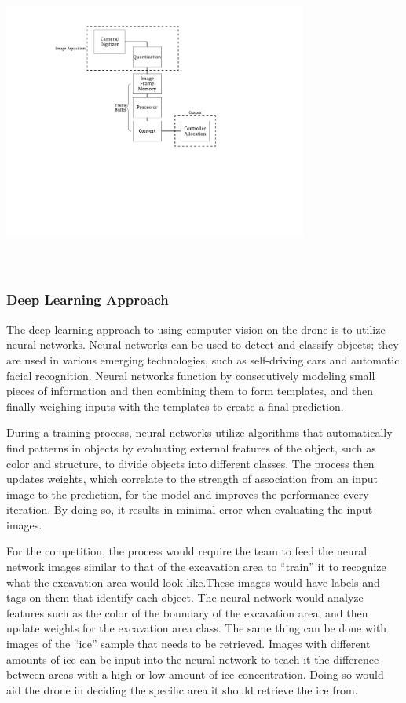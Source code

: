 \includegraphics[width = 10cm, height = 10cm]{img/PL/digital.pdf}

		\subsubsection{Deep Learning Approach}
			The deep learning approach to using computer vision on the drone is to utilize neural networks. Neural networks can be used to detect and classify objects; they are used in various emerging technologies, such as self-driving cars and automatic facial recognition. 
			Neural networks function by consecutively modeling small pieces of information and then combining them to form templates, and then finally weighing inputs with the templates to create a final prediction.
		
			During a training process, neural networks utilize algorithms that automatically find patterns in objects by evaluating external features of the object, such as color and structure, to divide objects into different classes. The process then updates weights, which correlate to the strength of association from an input image to the prediction, for the model and improves the performance every iteration. By doing so, it results in minimal error when evaluating the input images.
		
			For the competition, the process would require the team to feed the neural network images similar to that of the excavation area to “train” it to recognize what the excavation area would look like.These images would have labels and tags on them that identify each object. The neural network would analyze features such as the color of the boundary of the excavation area, and then update weights for the excavation area class. The same thing can be done with images of the “ice” sample that needs to be retrieved. Images with different amounts of ice can be input into the neural network to teach it the difference between areas with a high or low amount of ice concentration. Doing so would aid the drone in deciding the specific area it should retrieve the ice from.
		
